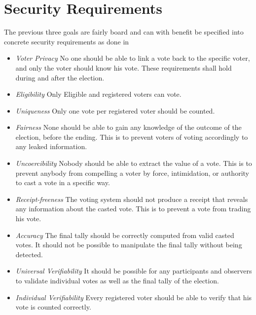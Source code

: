 \section{Security Requirements} \label{sec:security_requirements}
The previous three goals are fairly board and can with benefit be specified into concrete security requirements as done in \cite{Cet08}

\begin{itemize}
    \item \textit{Voter Privacy}
        No one should be able to link a vote back to the specific voter, and only the voter should
        know his vote. These requirements shall hold during and after the election.  
    
    \item \textit{Eligibility}    
        Only Eligible and registered voters can vote. 
    
    \item \textit{Uniqueness}
        Only one vote per registered voter should be counted.
    
    \item \textit{Fairness}
        None should be able to gain any knowledge of the outcome of the election, before the ending. This is to prevent voters of voting accordingly to any leaked information. 
    
    \item \textit{Uncoercibility}
        Nobody should be able to extract the value of a vote. This is to prevent anybody from compelling a voter by force, intimidation, or authority to cast a vote in a specific way. 
    
    \item \textit{Receipt-freeness} 
        The voting system should not produce a receipt that reveals any information about the casted vote. This is to prevent a vote from trading his vote. 
    
    \item \textit{Accuracy} 
        The final tally should be correctly computed from valid casted votes. It should not be
        possible to manipulate the final tally without being detected. 
    
    \item \textit{Universal Verifiability}
        It should be possible for any participants and observers to validate individual votes as well as the final tally of the election. 
    
    \item \textit{Individual Verifiability}    
        Every registered voter should be able to verify that his vote is counted correctly. 
    
\end{itemize}


